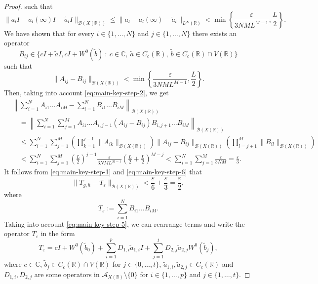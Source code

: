 \documentclass[reqno]{amsproc}
\newcommand{\cA}{\mathcal{A}}
\newcommand{\cB}{\mathcal{B}}
\newcommand{\eps}{\varepsilon}
\newcommand{\C}{\mathbb{C}}
\newcommand{\R}{\mathbb{R}}
\theoremstyle{definition}
\theoremstyle{remark}
\numberwithin{equation}{section}
\begin{document}
\begin{proof}
such that
\[
\|a_lI-a_l(\infty)I-\widetilde{a}_lI\|_{\cB(X(\R))}
\le 
\|a_l-a_l(\infty)-\widetilde{a}_l\|_{L^\infty(\R)}
<
\min\left\{\frac{\eps}{3NML^{M-1}},\frac{L}{2}\right\}.
\]
We have shown that for every $i\in\{1,\dots,N\}$ and $j\in\{1,\dots,N\}$
there exists an operator
\begin{equation}\label{eq:main-key-step-5}
B_{ij}\in\big\{cI+\widetilde{a}I,cI+W^0(\widetilde{b})\ :\
c\in\C,\ \widetilde{a}\in C_c(\R),\ \widetilde{b}\in C_c(\R)\cap V(\R)\big\}
\end{equation}
such that
\[
\|A_{ij}-B_{ij}\|_{\cB(X(\R))}
<
\min\left\{\frac{\eps}{3NML^{M-1}},\frac{L}{2}\right\}.
\]
Then, taking into account \eqref{eq:main-key-step-2}, we get
\begin{align}
&
\left\|
\sum_{i=1}^N A_{i1}\dots A_{iM}
-
\sum_{i=1}^N B_{i1}\dots B_{iM}
\right\|_{\cB(X(\R))}
\nonumber\\
&\quad=
\left\|
\sum_{i=1}^N\sum_{j=1}^M 
A_{i1}\dots A_{i,j-1}
(A_{ij}-B_{ij})B_{i,j+1}\dots B_{iM}
\right\|_{\cB(X(\R))}
\nonumber\\
&\quad\le
\sum_{i=1}^N\sum_{j=1}^M
\left(\prod_{k=1}^{j-1}\|A_{ik}\|_{\cB(X(\R))}\right)
\|A_{ij}-B_{ij}\|_{\cB(X(\R))} 
\left(\prod_{l=j+1}^{M}\|B_{il}\|_{\cB(X(\R))}\right)
\nonumber\\
&\quad<
\sum_{i=1}^N\sum_{j=1}^M
\left(\frac{L}{2}\right)^{j-1}
\frac{\eps}{3NML^{M-1}}
\left(\frac{L}{2}+\frac{L}{2}\right)^{M-j}
<
\sum_{i=1}^N\sum_{j=1}^M
\frac{\eps}{3NM}
=
\frac{\eps}{3}.
\label{eq:main-key-step-6}
\end{align}
It follows from \eqref{eq:main-key-step-1} and
\eqref{eq:main-key-step-6} that
\begin{equation}\label{eq:main-key-step-7}
\|T_{g,h}-T_\eps\|_{\cB(X(\R))}
<
\frac{\eps}{6}+\frac{\eps}{3}
=
\frac{\eps}{2},
\end{equation}
where
\[
T_\eps:=\sum_{i=1}^N B_{i1}\dots B_{iM}.
\]
Taking into account \eqref{eq:main-key-step-5}, we can rearrange
terms and write the operator $T_\eps$ in the form
\begin{equation}\label{eq:main-key-step-8}
T_\eps=cI+W^0(\widetilde{b}_0)
+
\sum_{i=1}^p D_{1,i}\widetilde{a}_{1,i}I
+
\sum_{j=1}^t D_{2,j}\widetilde{a}_{2,j}W^0(\widetilde{b}_j),
\end{equation}
where $c\in\C$, $\widetilde{b}_j\in C_c(\R)\cap V(\R)$
for $j\in\{0,\dots,t\}$, 
$\widetilde{a}_{1,i},\widetilde{a}_{2,j}\in C_c(\R)$
and $D_{1,i},D_{2,j}$ are some operators in
$\cA_{X(\R)}\setminus\{0\}$
for $i\in\{1,\dots,p\}$ and $j\in\{1,\dots,t\}$.


\end{proof}
\end{document}
